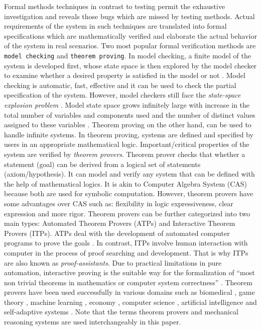 Formal methods techniques in contrast to testing permit the exhaustive investigation and reveals those bugs which are missed by testing methods. 
Actual requirements of the system in such techniques are 
translated into formal specifications which are mathematically verified and elaborate the actual behavior of the system in real scenarios. 
Two most popular formal verification methods are \texttt{model checking}
and  \texttt{theorem proving}. 
In  model checking, a finite model of the system is developed first, whose state space 
is then explored by the model checker to examine whether a desired property is satisfied in the model or not . Model checking is 
automatic, fast, effective and it can be used to check the partial specification of the system. However, model checkers 
still face the {\em state-space explosion problem} . Model state space grows infinitely large with increase in the 
total number of variables and components used and the number of distinct values assigned to these variables . 
Theorem proving on the other hand, can be used to handle infinite systems. In theorem proving, systems are defined and specified by users in an
appropriate mathematical logic. Important/critical properties of the system are verified by {\em theorem provers}. 
Theorem prover checks that whether a statement (goal) can be derived from a logical set of statements (axiom/hypothesis). It can 
model and verify any system that can be defined with the help of mathematical logics.
It is akin to Computer Algebra System (CAS) because both are used for symbolic computation. However, theorem provers have some advantages 
over CAS such as: flexibility in logic expressiveness, clear expression and more rigor. Theorem provers can be further categorized into 
two main types: Automated Theorem Provers (ATPs) and Interactive Theorem Provers (ITPs). ATPs deal with the development of automated computer 
programs to prove the goals . In contrast, ITPs involve human 
interaction with computer in the process of proof searching and development. That is why ITPs are also known as {\em proof-assistants}. 
Due to practical limitations in pure automation, interactive proving is the suitable way 
for the formalization of ``most non trivial theorems in mathematics or computer system correctness'' .
Theorem provers have been used successfully in various domains such as biomedical , 
game theory , machine learning , economy , computer science , 
artificial intelligence  and self-adaptive systems .  
Note that the terms theorem provers and
mechanical reasoning systems are used interchangeably in this paper.
